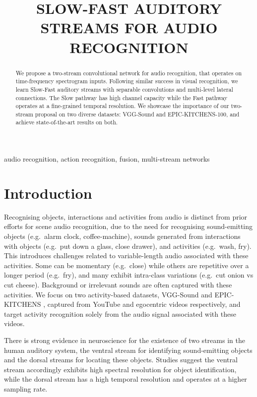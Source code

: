 \documentclass{article}
\title{SLOW-FAST AUDITORY STREAMS FOR AUDIO RECOGNITION}
\begin{document}
\maketitle


\begin{abstract}
We propose a two-stream convolutional network for audio recognition, that operates on time-frequency spectrogram inputs. 
Following similar success in visual recognition, we learn Slow-Fast auditory streams with separable convolutions and multi-level lateral connections. 
The Slow pathway has high channel capacity while the Fast pathway operates at a fine-grained temporal resolution.
We showcase the importance of our two-stream proposal on two diverse datasets: VGG-Sound and EPIC-KITCHENS-100, and achieve state-of-the-art results on both.
\end{abstract}

\begin{keywords}
audio recognition, action recognition, fusion, multi-stream networks
\end{keywords}

\section{Introduction}
\label{sec:intro}

Recognising objects, interactions and activities from audio is distinct from prior efforts for scene audio recognition, due to the need for recognising sound-emitting objects (e.g.\ alarm clock, coffee-machine), sounds generated from interactions with objects (e.g.\ put down a glass, close drawer), and activities (e.g.\ wash, fry). 
This introduces challenges related to variable-length audio associated with these activities. Some can be momentary (e.g.\ close) while others are repetitive over a longer period (e.g.\ fry), and many exhibit intra-class variations (e.g.\ cut onion vs cut cheese). Background or irrelevant sounds are often captured with these activities.
We focus on two activity-based datasets, VGG-Sound \cite{vggsound} and EPIC-KITCHENS \cite{Damen2020RESCALING}, captured from YouTube and egocentric videos respectively, and target activity recognition solely from the audio signal associated with these videos.

There is strong evidence in neuroscience for the existence of two streams in the human auditory system, the ventral stream for identifying sound-emitting objects and the dorsal streams for locating these objects. Studies \cite{santoro,zulfiqar} suggest the ventral stream accordingly exhibits high spectral resolution for object identification, while the dorsal stream has a high temporal resolution and operates at a higher sampling rate. 
\end{document}
